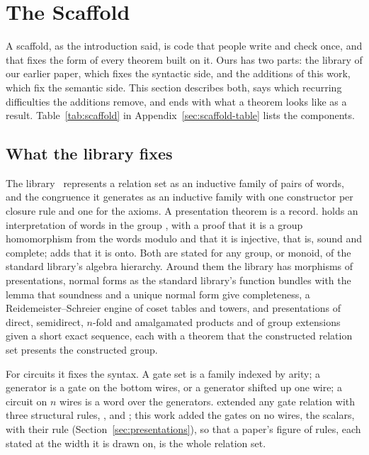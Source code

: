 \section{The Scaffold}\label{sec:scaffold}

A scaffold, as the introduction said, is code that people write and
check once, and that fixes the form of every theorem built on it. Ours
has two parts: the library of our earlier paper, which fixes the
syntactic side, and the additions of this work, which fix the semantic
side. This section describes both, says which recurring difficulties
the additions remove, and ends with what a theorem looks like as a
result. Table~\ref{tab:scaffold} in Appendix~\ref{sec:scaffold-table} lists the components.

\subsection{What the library fixes}\label{sec:library}

The library~\cite{anonymous2027popl} represents a relation set as an
inductive family  of pairs of words, and the congruence
it generates as an inductive family  with one constructor per
closure rule and one for the axioms. A presentation theorem is a record.
 holds an interpretation  of
words in the group , with a proof that it is a group
homomorphism from the words modulo  and that it is injective,
that is, sound and complete;  adds that it is
onto. Both are stated for any group, or monoid, of the standard
library's algebra hierarchy. Around them the library has morphisms of
presentations, normal forms as the standard library's function bundles
with the lemma that soundness and a unique normal form give
completeness, a Reidemeister--Schreier engine of coset tables and
towers, and presentations of direct, semidirect, $n$-fold and
amalgamated products and of group extensions given a short exact
sequence, each with a theorem that the constructed relation set
presents the constructed group.

For circuits it fixes the syntax. A gate set is a family
 indexed by arity; a generator is a gate on the
bottom wires, or a generator shifted up one wire; a circuit on $n$
wires is a word over the generators.  extended any
gate relation with three structural rules, ,  and
; this work added the gates on no wires, the scalars, with
their rule  (Section~\ref{sec:presentations}), so that a
paper's figure of rules, each stated at the width it is drawn on, is
the whole relation set.

